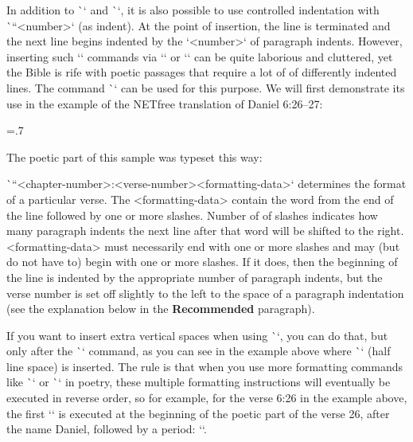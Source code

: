 In addition to \`\begcenter` and \`\endcenter`, it is also possible to use controlled 
indentation with \`\ind``<number>` (as indent). 
At the point of insertion, the line is terminated and the next line begins indented by the
`<number>` of paragraph indents. However, inserting such `\ind` commands
via `\fmtins` or `\fmtpre` can be quite laborious and
cluttered, yet the Bible is rife with poetic passages that require a lot of
of differently indented lines. The command \`\fmtpoetry` can be used for this purpose.
We will first demonstrate its use in the example of the NETfree translation of 
Daniel 6:26--27:

\medskip
\centerline{\picw=.7\hsize{} }
\vskip-2pt %



The poetic part of this sample was typeset this way:
\begtt
{}
\endtt








\`\fmtpoetry``{<chapter-number>:<verse-number>}{<formatting-data>}` determines the 
format of a particular verse. The <formatting-data>
contain the word from the end of the line followed by one or more slashes. Number of
of slashes indicates how many paragraph indents the next line after 
that word will be shifted to the right. <formatting-data> must necessarily end with one or more
slashes and may (but do not have to) begin with one or more slashes.  If
it does, then the beginning of the line is indented by the appropriate number of paragraph indents,
but the verse number is set off slightly to the left to the space of a paragraph
indentation (see the explanation below in the {\bf Recommended} paragraph).

If you want to insert extra vertical spaces when using \`\fmtpoetry`, 
you can do that, but only after the \`\fmtpoetry` command, as you can  see in the example above where
\`\medskip` (half line space) is inserted. 
The rule is that when you use more formatting commands like \`\fmtins` or \`\fmtpre` in poetry, 
these multiple formatting instructions will eventually be executed
in reverse order, so for example, for the verse 6:26 in the  example above, 
the first `\medskip` is executed at the beginning of the poetic part of the verse 
26, after the name Daniel, followed by a period: ``.

